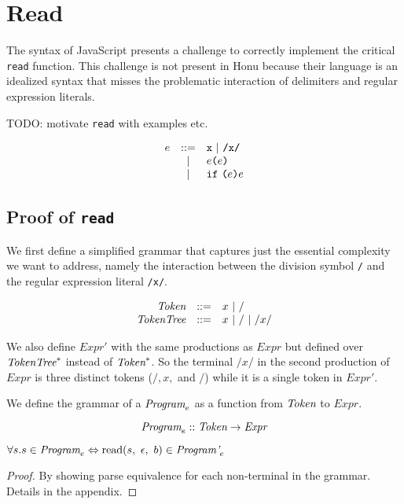\documentclass[preprint,10pt]{sigplanconf}
\begin{document}
\section{Read}
\label{sec-3}

The syntax of JavaScript presents a challenge to correctly implement
the critical \texttt{read} function. This challenge is not present in Honu
because their language is an idealized syntax that misses the
problematic interaction of delimiters and regular expression literals.

TODO: motivate \texttt{read} with examples etc.

\[
\begin{array}{rcl}
  e &::=& \texttt{x} ~|~ \texttt{/x/} \\
  &|& e \texttt{(}e\texttt{)} \\
  &|& \texttt{if}~\texttt{(}e\texttt{)}e
\end{array}
\]

\subsection{Proof of \texttt{read}}
\label{sec-3-1}

We first define a simplified grammar that captures just the essential
complexity we want to address, namely the interaction between
the division symbol \texttt{/} and the regular expression literal
\texttt{/x/}.

\[
\begin{array}{rrl}
  \textit{Token} &::=& x ~|~ /
  \\
  \textit{TokenTree} &::=& x ~|~ / ~|~ /x/
  \\
\end{array}
\]

We also define \( \textit{Expr}' \) with the same productions as \(
\textit{Expr} \) but defined over \( \textit{TokenTree}^{*} \) instead of \( \textit{Token}^{*}
\). So the terminal \( /x/ \) in the second production of \(
\textit{Expr} \) is three distinct tokens (\( /, x, \) and \( /
\)) while it is a single token in \( \textit{Expr}' \).

We define the grammar of a \( \textit{Program}_{e} \) as a function from
\( \textit{Token} \) to \( \textit{Expr} \).

\[
\textit{Program}_{e} :: \textit{Token} \rightarrow \textit{Expr}
\]

\begin{theorem}\mbox{}

  \( \forall s. s \in \textit{Program}_{e} \Leftrightarrow 
  \textrm{read}(s,~\epsilon,~b) \in \textit{Program'}_{e} \)

\end{theorem}
\begin{proof}\mbox{}
  
By showing parse equivalence for each non-terminal in the grammar.
Details in the appendix.
\end{proof}
\end{document}
